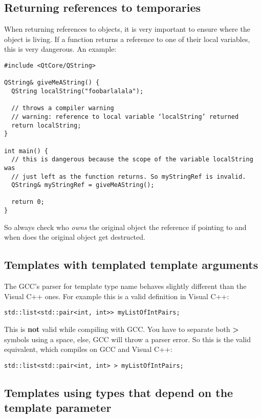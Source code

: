 \subsection{Returning references to temporaries}

When returning references to objects, it is very important to ensure where the object is living. If a function returns a reference to one of their local variables, this is very dangerous. An example:

\begin{verbatim}
#include <QtCore/QString>

QString& giveMeAString() {
  QString localString("foobarlalala");

  // throws a compiler warning
  // warning: reference to local variable ‘localString’ returned
  return localString;
}

int main() {
  // this is dangerous because the scope of the variable localString was 
  // just left as the function returns. So myStringRef is invalid.
  QString& myStringRef = giveMeAString();

  return 0;
}
\end{verbatim}

So always check who \emph{owns} the original object the reference if pointing to and when does the original object get destructed.

\subsection{Templates with templated template arguments}

The GCC's parser for template type name behaves slightly different than the Visual C++ ones. For example this is a valid definition in Visual C++:

\begin{verbatim}
std::list<std::pair<int, int>> myListOfIntPairs; 
\end{verbatim}

This is \textbf{not} valid while compiling with GCC. You have to separate both \textbf{>} symbols using a space, else, GCC will throw a parser error. So this is the valid equivalent, which compiles on GCC and Visual C++: 

\begin{verbatim}
std::list<std::pair<int, int> > myListOfIntPairs; 
\end{verbatim}

\subsection{Templates using types that depend on the template parameter}

